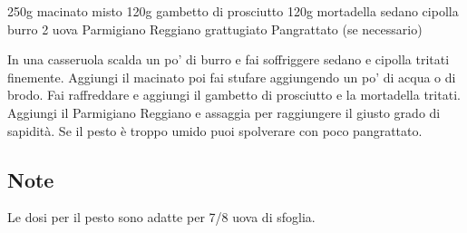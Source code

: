 \begin{ingreds}
	250g macinato misto
	120g gambetto di prosciutto
	120g mortadella
	sedano
	cipolla
	burro
	2 uova
	Parmigiano Reggiano grattugiato
	Pangrattato (se necessario)

\end{ingreds}

\begin{method}
In una casseruola scalda un po' di burro e fai soffriggere sedano e cipolla tritati finemente. Aggiungi il macinato poi fai stufare aggiungendo un po' di acqua o di brodo. Fai raffreddare e aggiungi il gambetto di prosciutto e la mortadella tritati. Aggiungi il Parmigiano Reggiano e assaggia per raggiungere il giusto grado di sapidità. Se il pesto è troppo umido puoi spolverare con poco pangrattato.


\end{method}

\subsection*{Note}
Le dosi per il pesto sono adatte per 7/8 uova di sfoglia.



